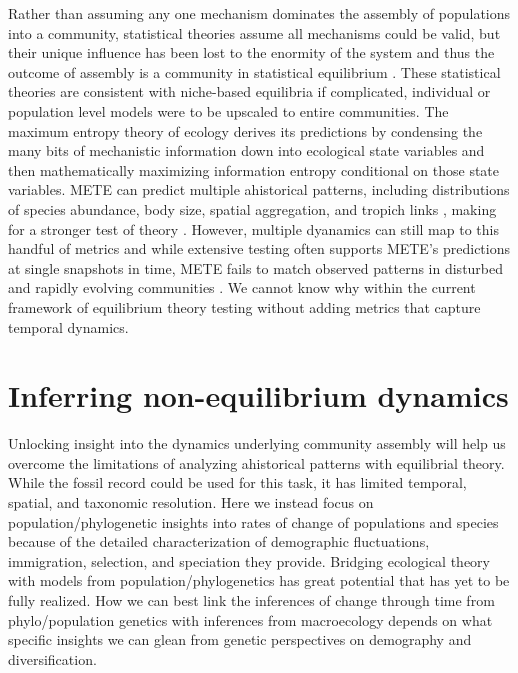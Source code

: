 \documentclass[12pt]{article}
\begin{document}
Rather than assuming any one mechanism dominates the assembly of
populations into a community, statistical theories assume all
mechanisms could be valid, but their unique influence has been lost to
the enormity of the system and thus the outcome of assembly is a
community in statistical equilibrium \citep{harte2011,
  pueyo2007}. These statistical theories are consistent with
niche-based equilibria \citep{pueyo2007, neill2009} if complicated,
individual or population level models were to be upscaled to entire
communities. The maximum entropy theory of ecology
\citep[METE][]{harte2011} derives its predictions by condensing the
many bits of mechanistic information down into ecological state
variables and then mathematically maximizing information entropy
conditional on those state variables. METE can predict multiple
ahistorical patterns, including distributions of species abundance,
body size, spatial aggregation, and tropich links \citep{harte2011,
  rominger2015}, making for a stronger test of theory
\citep{mcgill2003}. However, multiple dyanamics can still map to
this handful of metrics \citep{mcgill2007} and while extensive
testing often supports METE's predictions \citep{harte2011,
  white2012, xiao2015} at single snapshots in time, METE fails
to match observed patterns in disturbed and rapidly evolving
communities \citep{rominger2015, harte2011}. We cannot know why
within the current framework of equilibrium theory testing without
adding metrics that capture temporal dynamics.


\section{Inferring non-equilibrium dynamics}

Unlocking insight into the dynamics underlying community assembly will
help us overcome the limitations of analyzing ahistorical patterns
with equilibrial theory. While the fossil record could be used for
this task, it has limited temporal, spatial, and taxonomic
resolution. 
%
%
Here we instead focus on population/phylogenetic insights into rates
of change of populations and species because of the detailed
characterization of demographic fluctuations, immigration, selection,
and speciation they provide. Bridging ecological theory with models
from population/phylogenetics has great potential \citep{webb2002,
  lavergne2010, mcgaughran2015, laroche2015, papadopoulou2011,
  dexter2012} that has yet to be fully realized. How we can best link
the inferences of change through time from phylo/population genetics
with inferences from macroecology depends on what specific insights we
can glean from genetic perspectives on demography and diversification.
\end{document}
